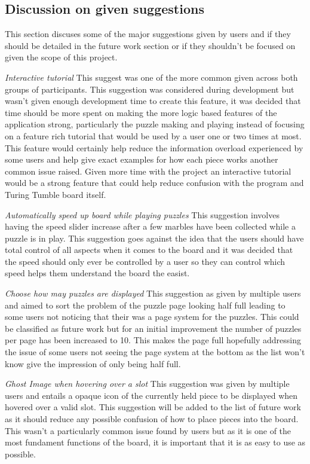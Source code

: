 \documentclass{l4proj}
\begin{document}
\subsection{Discussion on given suggestions}
This section discuses some of the major suggestions given by users and if they should be detailed in the future work section or if they shouldn't be focused on given the scope of this project.

\emph{Interactive tutorial}
This suggest was one of the more common given across both groups of participants. This suggestion was considered during development but wasn't given enough development time to create this feature, it was decided that time should be more spent on making the more logic based features of the application strong, particularly the puzzle making and playing instead of focusing on a feature rich tutorial that would be used by a user one or two times at most. This feature would certainly help reduce the information overload experienced by some users and help give exact examples for how each piece works another common issue raised. Given more time with the project an interactive tutorial would be a strong feature that could help reduce confusion with the program and Turing Tumble board itself. 

\emph{Automatically speed up board while playing puzzles}
This suggestion involves having the speed slider increase after a few marbles have been collected while a puzzle is in play. This suggestion goes against the idea that the users should have total control of all aspects when it comes to the board and it was decided that the speed should only ever be controlled by a user so they can control which speed helps them understand the board the easist.

\emph{Choose how may puzzles are displayed}
This suggestion as given by multiple users and aimed to sort the problem of the puzzle page looking half full leading to some users not noticing that their was a page system for the puzzles. This could be classified as future work but for an initial improvement the number of puzzles per page has been increased to 10. This makes the page full hopefully addressing the issue of some users not seeing the page system at the bottom as the list won't know give the impression of only being half full.

\emph{Ghost Image when hovering over a slot}
This suggestion was given by multiple users and entails a opaque icon of the currently held piece to be displayed when hovered over a valid slot. This suggestion will be added to the list of future work as it should reduce any possible confusion of how to place pieces into the board. This wasn't a particularly common issue found by users but as it is one of the most fundament functions of the board, it is important that it is as easy to use as possible.
\end{document}
